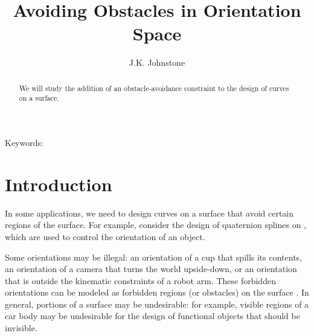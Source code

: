 \newif\ifFull
\Fullfalse

\SingleSpace

\setlength{\oddsidemargin}{0pt}
\setlength{\headsep}{3em}
\setlength{\textheight}{8.75in}
\setlength{\textwidth}{6.5in}
\setlength{\columnsep}{5mm}		%

\pagestyle{myheadings}


\title{Avoiding Obstacles in Orientation Space}
\author{J.K. Johnstone}


\maketitle

\begin{abstract}
We will study the addition of an obstacle-avoidance constraint 
to the design of curves on a surface.
\end{abstract}

\vspace{1in}

\noindent Keywords: 

\clearpage

\section{Introduction}

In some applications, we need to design 
curves on a surface that avoid certain regions of the surface.
For example, consider the design of quaternion splines on ,
which are used to control the orientation of an object.

Some orientations may be illegal: an orientation of a cup
that spills its contents, an orientation of a camera that turns
the world upside-down, or an orientation
that is outside the kinematic constraints of a robot arm.
These forbidden orientations can be modeled as forbidden regions
(or obstacles) on the surface .
In general, portions of a surface may be undesirable:
for example, visible regions of a car body may be undesirable
for the design of functional objects that should be invisible.


